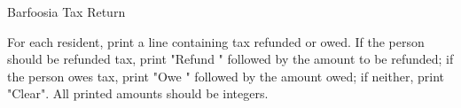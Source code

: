 \begin{problem}{Barfoosia Tax Return}
\OutputFile

For each resident, print a line containing tax refunded or owed. If the person should be refunded tax, print "Refund " followed by the amount to be refunded; if the person owes tax, print "Owe " followed by the amount owed; if neither, print "Clear". All printed amounts should be integers. 

\Examples

\begin{example}
%
\end{example}

\end{problem}
